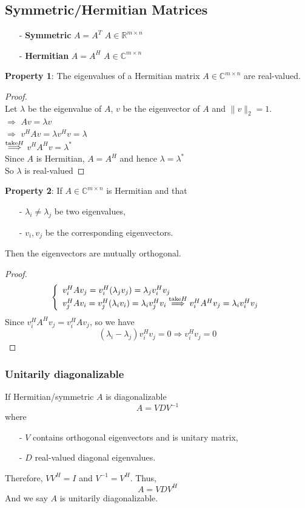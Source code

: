\begin{multicols}{2}
\subsection{Symmetric/Hermitian Matrices}
\begin{itemize}
    \item [-] \textbf{Symmetric} $A=A^T$ $A\in\mathbb{R}^{m\times n}$\\
    \item [-] \textbf{Hermitian} $A=A^H$ $A\in\mathbb{C}^{m\times n}$
\end{itemize}
\textbf{Property 1}: The eigenvalues of a Hermitian matrix $A\in\mathbb{C}^{m\times n}$ are real-valued. \\
\begin{proof} \\
    Let $\lambda$ be the eigenvalue of $A$, $v$ be the eigenvector of $A$ and $\|v\|_2=1$. \\
    $\Longrightarrow$ $Av=\lambda v$ \\
    $\Longrightarrow$ $v^HAv=\lambda v^Hv=\lambda$ \\
    $\overset{\text{\rm take} H}{\Longrightarrow}$ $v^HA^Hv=\lambda^*$ \\
    Since $A$ is Hermitian, $A=A^H$ and hence $\lambda = \lambda^*$ \\
    So $\lambda$ is real-valued
\end{proof}
\textbf{Property 2}: If $A\in\mathbb{C}^{m\times n}$ is Hermitian and that 
\begin{itemize}
    \item [-] $\lambda_i\neq\lambda_j$ be two eigenvalues,
    \item [-] $v_i, v_j$ be the corresponding eigenvectors.
\end{itemize}
Then the eigenvectors are mutually orthogonal. \\
\begin{proof}
    \[
    \left\{\begin{array}{l}
        v_i^HAv_j = v_i^H(\lambda_jv_j)=\lambda_jv_i^Hv_j \\
        v_j^HAv_i = v_j^H(\lambda_iv_i)=\lambda_iv_j^Hv_i \overset{\text{\rm take} H}{\Longrightarrow} v_i^HA^Hv_j = \lambda_iv_i^Hv_j
    \end{array}\right.
    \]
    Since $v_i^HA^Hv_j=v_i^HAv_j$, so we have
    \[
        (\lambda_i-\lambda_j)v_i^Hv_j = 0 \Longrightarrow v_i^Hv_j = 0
    \]
\end{proof}

\subsubsection{Unitarily diagonalizable}
If Hermitian/symmetric $A$ is diagonalizable
\[
    A=VDV^{-1}
\]
where
\begin{itemize}
    \item [-] $V$ contains orthogonal eigenvectors and is unitary matrix,
    \item [-] $D$ real-valued diagonal eigenvalues.
\end{itemize}
Therefore, $VV^H=I$ and $V^{-1}=V^H$. Thus, 
\[
    A = VDV^H
\]
And we say $A$ is unitarily diagonalizable.


\end{multicols}
